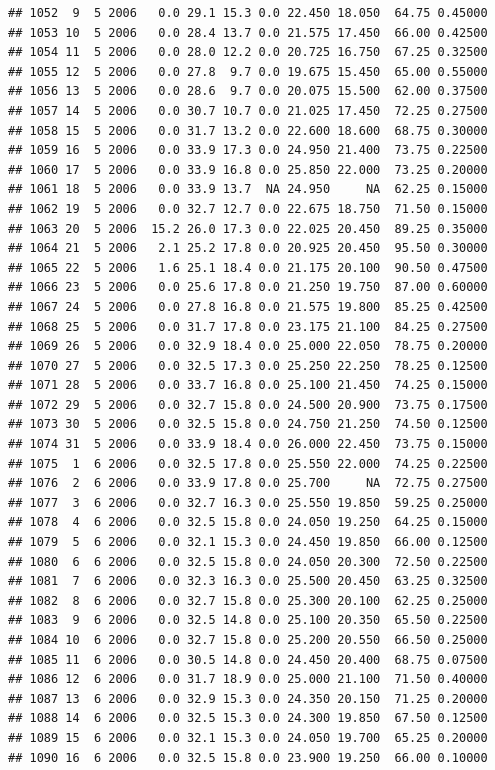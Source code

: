 \documentclass[
]{book}
\begin{document}
\begin{verbatim}
## 1052  9  5 2006   0.0 29.1 15.3 0.0 22.450 18.050  64.75 0.45000
## 1053 10  5 2006   0.0 28.4 13.7 0.0 21.575 17.450  66.00 0.42500
## 1054 11  5 2006   0.0 28.0 12.2 0.0 20.725 16.750  67.25 0.32500
## 1055 12  5 2006   0.0 27.8  9.7 0.0 19.675 15.450  65.00 0.55000
## 1056 13  5 2006   0.0 28.6  9.7 0.0 20.075 15.500  62.00 0.37500
## 1057 14  5 2006   0.0 30.7 10.7 0.0 21.025 17.450  72.25 0.27500
## 1058 15  5 2006   0.0 31.7 13.2 0.0 22.600 18.600  68.75 0.30000
## 1059 16  5 2006   0.0 33.9 17.3 0.0 24.950 21.400  73.75 0.22500
## 1060 17  5 2006   0.0 33.9 16.8 0.0 25.850 22.000  73.25 0.20000
## 1061 18  5 2006   0.0 33.9 13.7  NA 24.950     NA  62.25 0.15000
## 1062 19  5 2006   0.0 32.7 12.7 0.0 22.675 18.750  71.50 0.15000
## 1063 20  5 2006  15.2 26.0 17.3 0.0 22.025 20.450  89.25 0.35000
## 1064 21  5 2006   2.1 25.2 17.8 0.0 20.925 20.450  95.50 0.30000
## 1065 22  5 2006   1.6 25.1 18.4 0.0 21.175 20.100  90.50 0.47500
## 1066 23  5 2006   0.0 25.6 17.8 0.0 21.250 19.750  87.00 0.60000
## 1067 24  5 2006   0.0 27.8 16.8 0.0 21.575 19.800  85.25 0.42500
## 1068 25  5 2006   0.0 31.7 17.8 0.0 23.175 21.100  84.25 0.27500
## 1069 26  5 2006   0.0 32.9 18.4 0.0 25.000 22.050  78.75 0.20000
## 1070 27  5 2006   0.0 32.5 17.3 0.0 25.250 22.250  78.25 0.12500
## 1071 28  5 2006   0.0 33.7 16.8 0.0 25.100 21.450  74.25 0.15000
## 1072 29  5 2006   0.0 32.7 15.8 0.0 24.500 20.900  73.75 0.17500
## 1073 30  5 2006   0.0 32.5 15.8 0.0 24.750 21.250  74.50 0.12500
## 1074 31  5 2006   0.0 33.9 18.4 0.0 26.000 22.450  73.75 0.15000
## 1075  1  6 2006   0.0 32.5 17.8 0.0 25.550 22.000  74.25 0.22500
## 1076  2  6 2006   0.0 33.9 17.8 0.0 25.700     NA  72.75 0.27500
## 1077  3  6 2006   0.0 32.7 16.3 0.0 25.550 19.850  59.25 0.25000
## 1078  4  6 2006   0.0 32.5 15.8 0.0 24.050 19.250  64.25 0.15000
## 1079  5  6 2006   0.0 32.1 15.3 0.0 24.450 19.850  66.00 0.12500
## 1080  6  6 2006   0.0 32.5 15.8 0.0 24.050 20.300  72.50 0.22500
## 1081  7  6 2006   0.0 32.3 16.3 0.0 25.500 20.450  63.25 0.32500
## 1082  8  6 2006   0.0 32.7 15.8 0.0 25.300 20.100  62.25 0.25000
## 1083  9  6 2006   0.0 32.5 14.8 0.0 25.100 20.350  65.50 0.22500
## 1084 10  6 2006   0.0 32.7 15.8 0.0 25.200 20.550  66.50 0.25000
## 1085 11  6 2006   0.0 30.5 14.8 0.0 24.450 20.400  68.75 0.07500
## 1086 12  6 2006   0.0 31.7 18.9 0.0 25.000 21.100  71.50 0.40000
## 1087 13  6 2006   0.0 32.9 15.3 0.0 24.350 20.150  71.25 0.20000
## 1088 14  6 2006   0.0 32.5 15.3 0.0 24.300 19.850  67.50 0.12500
## 1089 15  6 2006   0.0 32.1 15.3 0.0 24.050 19.700  65.25 0.20000
## 1090 16  6 2006   0.0 32.5 15.8 0.0 23.900 19.250  66.00 0.10000

\end{verbatim}
\end{document}
